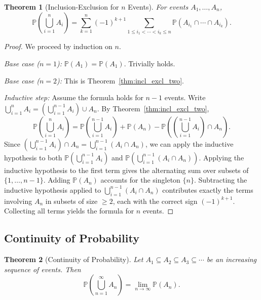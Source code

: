 \documentclass[11pt,a4paper]{article}
\theoremstyle{definition}
\theoremstyle{plain}
\newtheorem{theorem}{Theorem}[section]
\theoremstyle{remark}
\newcommand{\Prob}{\mathbb{P}}
\begin{document}
\begin{theorem}[Inclusion-Exclusion for $n$ Events]
\label{thm:incl_excl_n}
For events $A_1, \ldots, A_n$,
\[
    \Prob\!\left(\bigcup_{i=1}^n A_i\right) = \sum_{k=1}^n (-1)^{k+1}
    \sum_{1 \leq i_1 < \cdots < i_k \leq n} \Prob(A_{i_1} \cap \cdots \cap A_{i_k}).
\]
\end{theorem}

\begin{proof}
We proceed by induction on $n$.

\emph{Base case ($n = 1$):} $\Prob(A_1) = \Prob(A_1)$. Trivially holds.

\emph{Base case ($n = 2$):} This is Theorem~\ref{thm:incl_excl_two}.

\emph{Inductive step:} Assume the formula holds for $n-1$ events. Write
$\bigcup_{i=1}^n A_i = \left(\bigcup_{i=1}^{n-1} A_i\right) \cup A_n$. By
Theorem~\ref{thm:incl_excl_two},
\[
    \Prob\!\left(\bigcup_{i=1}^n A_i\right) = \Prob\!\left(\bigcup_{i=1}^{n-1} A_i\right)
    + \Prob(A_n) - \Prob\!\left(\left(\bigcup_{i=1}^{n-1} A_i\right) \cap A_n\right).
\]
Since $\left(\bigcup_{i=1}^{n-1} A_i\right) \cap A_n = \bigcup_{i=1}^{n-1}(A_i \cap A_n)$,
we can apply the inductive hypothesis to both $\Prob\!\left(\bigcup_{i=1}^{n-1} A_i\right)$
and $\Prob\!\left(\bigcup_{i=1}^{n-1}(A_i \cap A_n)\right)$. Applying the inductive hypothesis
to the first term gives the alternating sum over subsets of $\{1, \ldots, n-1\}$. Adding
$\Prob(A_n)$ accounts for the singleton $\{n\}$. Subtracting the inductive hypothesis
applied to $\bigcup_{i=1}^{n-1}(A_i \cap A_n)$ contributes exactly the terms involving
$A_n$ in subsets of size $\geq 2$, each with the correct sign $(-1)^{k+1}$. Collecting
all terms yields the formula for $n$ events.
\end{proof}

\subsection{Continuity of Probability}

\begin{theorem}[Continuity of Probability]
\label{thm:continuity_prob}
Let $A_1 \subseteq A_2 \subseteq A_3 \subseteq \cdots$ be an increasing sequence of
events. Then
\[
    \Prob\!\left(\bigcup_{n=1}^\infty A_n\right) = \lim_{n \to \infty} \Prob(A_n).
\]
\end{theorem}
\end{document}

